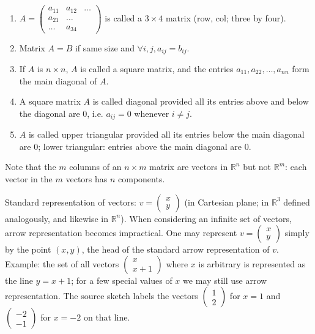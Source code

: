 \begin{enumerate}
\tightlist
\item
  \(A = \begin{pmatrix}
  a_{11} & a_{12} & \ldots \\
  a_{21} & \ldots & \\
  \ldots & a_{34} &
  \end{pmatrix}\) is called a \(3 \times 4\) matrix (row, col; three by four).
\item
  Matrix \(A = B\) if same size and \(\forall i,j,a_{ij} = b_{ij}\).
\item
  If \(A\) is \(n \times n\), \(A\) is called a square matrix, and the entries \(a_{11},a_{22},\ldots,a_{nn}\) form the main diagonal of \(A\).
\item
  A square matrix \(A\) is called diagonal provided all its entries above and below the diagonal are \(0\), i.e. \(a_{ij} = 0\) whenever \(i \neq j\).
\item
  \(A\) is called upper triangular provided all its entries below the main diagonal are \(0\); lower triangular: entries above the main diagonal are \(0\).
\end{enumerate}

Note that the \(m\) columns of an \(n \times m\) matrix are vectors in \(\mathbb{R}^{n}\) but not \(\mathbb{R}^{m}\): each vector in the \(m\) vectors has \(n\) components.

Standard representation of vectors: \(v = \begin{pmatrix}
x \\
y
\end{pmatrix}\) (in Cartesian plane; in \(\mathbb{R}^{3}\) defined analogously, and likewise in \(\mathbb{R}^{n}\)). When considering an infinite set of vectors, arrow representation becomes impractical. One may represent \(v = \begin{pmatrix}
x \\
y
\end{pmatrix}\) simply by the point \(\left( {x,y} \right)\), the head of the standard arrow representation of \(v\). Example: the set of all vectors \(\begin{pmatrix}
x \\
{x + 1}
\end{pmatrix}\) where \(x\) is arbitrary is represented as the line \(y = x + 1\); for a few special values of \(x\) we may still use arrow representation. The source sketch labels the vectors \(\begin{pmatrix}
1 \\
2
\end{pmatrix}\) for \(x = 1\) and \(\begin{pmatrix}
{- 2} \\
{- 1}
\end{pmatrix}\) for \(x = - 2\) on that line.

